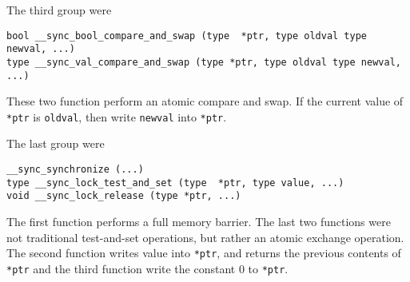 \documentclass[12pt]{article}
\begin{document}
The third group were
\begin{verbatim}
bool __sync_bool_compare_and_swap (type  *ptr, type oldval type newval, ...)
type __sync_val_compare_and_swap (type *ptr, type oldval type newval, ...)
\end{verbatim}
These two function perform an atomic compare and swap. If the current value of 
\texttt{*ptr} is \texttt{oldval}, then write \texttt{newval} into \texttt{*ptr}.

The last group were
\begin{verbatim}
__sync_synchronize (...)
type __sync_lock_test_and_set (type  *ptr, type value, ...)
void __sync_lock_release (type *ptr, ...)
\end{verbatim}
The first function performs a full memory barrier. The last two functions were 
not traditional test-and-set operations, but rather an atomic exchange operation. 
The second function writes value into \texttt{*ptr}, and returns the previous 
contents of \texttt{*ptr} and the third function write the constant 0 to 
\texttt{*ptr}.
\end{document}
